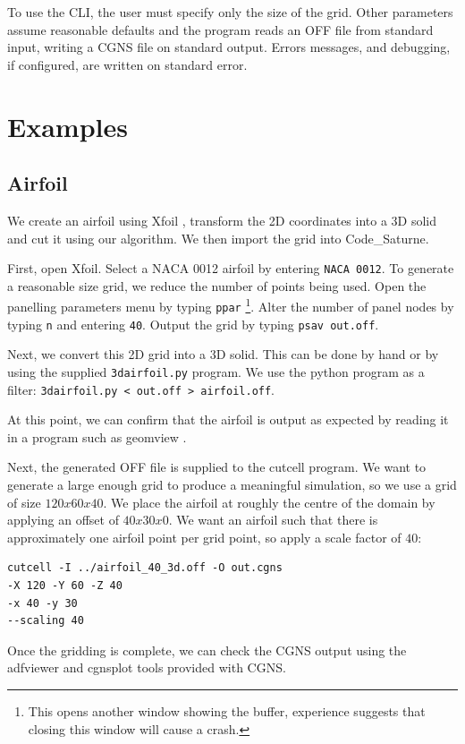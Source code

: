 \documentclass[a4paper,10pt]{article}
\begin{document}
To use the CLI, the user must specify only the size of the grid. Other
parameters assume reasonable defaults and the program reads an OFF file from
standard input, writing a CGNS file on standard output. Errors messages, and
debugging, if configured, are written on standard error.

\section{Examples}

\subsection{Airfoil}

We create an airfoil using Xfoil \cite{xfoil}, transform the 2D coordinates into
a 3D solid and cut it using our algorithm. We then import the grid into
Code\_Saturne.

First, open Xfoil. Select a NACA 0012 airfoil by entering \texttt{NACA 0012}. To
generate a reasonable size grid, we reduce the number of points being used. Open
the panelling parameters menu by typing \texttt{ppar} \footnote{This opens
another window showing the buffer, experience suggests that closing this window
will cause a crash.}. Alter the number of panel nodes by typing \texttt{n} and
entering \texttt{40}. Output the grid by typing \texttt{psav out.off}.

Next, we convert this 2D grid into a 3D solid. This can be done by hand or by
using the supplied \texttt{3dairfoil.py} program. We use the python program as
a filter: \texttt{3dairfoil.py < out.off > airfoil.off}.

At this point, we can confirm that the airfoil is output as expected by reading
it in a program such as geomview \cite{geomview}.

Next, the generated OFF file is supplied to the cutcell program. We want to
generate a large enough grid to produce a meaningful simulation, so we use a
grid of size $120 x 60 x 40$. We place the airfoil at roughly the centre of the
domain by applying an offset of $40 x 30 x 0$. We want an airfoil such that
there is approximately one airfoil point per grid point, so apply a scale
factor of $40$:

\begin{verbatim}
cutcell -I ../airfoil_40_3d.off -O out.cgns
-X 120 -Y 60 -Z 40
-x 40 -y 30
--scaling 40
\end{verbatim}

Once the gridding is complete, we can check the CGNS output using the adfviewer
and cgnsplot tools provided with CGNS.



\end{document}

